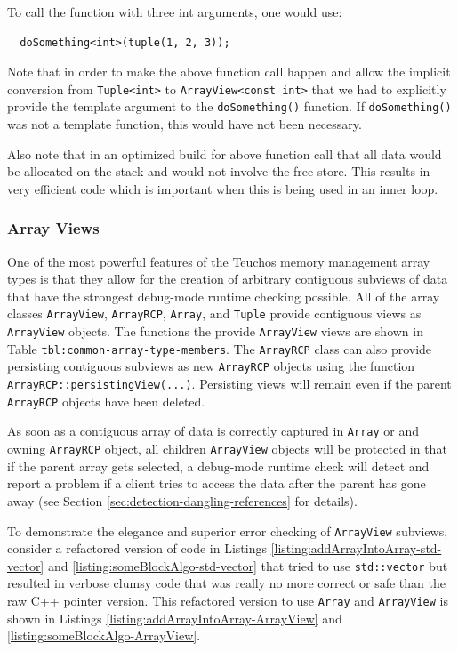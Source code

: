 \documentclass[pdf,ps2pdf,11pt]{SANDreport}
\begin{document}
To call the function with three int arguments, one would use:

{\small\begin{verbatim}
  doSomething<int>(tuple(1, 2, 3));
\end{verbatim}}

Note that in order to make the above function call happen and allow
the implicit conversion from {}\texttt{Tuple<int>} to
{}\texttt{ArrayView<const int>} that we had to explicitly provide the
template argument to the {}\texttt{doSomething()} function.  If
{}\texttt{doSomething()} was not a template function, this would have
not been necessary.

Also note that in an optimized build for above function call that all
data would be allocated on the stack and would not involve the
free-store.  This results in very efficient code which is important
when this is being used in an inner loop.


%
{}\subsubsection{Array Views}
\label{sec:array-views}
%

One of the most powerful features of the Teuchos memory management
array types is that they allow for the creation of arbitrary
contiguous subviews of data that have the strongest debug-mode runtime
checking possible.  All of the array classes {}\texttt{ArrayView},
{}\texttt{ArrayRCP}, {}\texttt{Array}, and {}\texttt{Tuple} provide
contiguous views as {}\texttt{ArrayView} objects.  The functions the
provide {}\texttt{ArrayView} views are shown in Table
{}\texttt{tbl:common-array-type-members}.  The {}\texttt{ArrayRCP}
class can also provide persisting contiguous subviews as new
{}\texttt{ArrayRCP} objects using the function
{}\texttt{ArrayRCP::persistingView(...)}.  Persisting views will
remain even if the parent {}\texttt{ArrayRCP} objects have been deleted.

As soon as a contiguous array of data is correctly captured in
{}\texttt{Array} or and owning {}\texttt{ArrayRCP} object, all
children {}\texttt{ArrayView} objects will be protected in that if the
parent array gets selected, a debug-mode runtime check will detect and
report a problem if a client tries to access the data after the parent
has gone away (see Section {}\ref{sec:detection-dangling-references}
for details).

To demonstrate the elegance and superior error checking of
{}\texttt{ArrayView} subviews, consider a refactored version of code
in Listings {}\ref{listing:addArrayIntoArray-std-vector} and
{}\ref{listing:someBlockAlgo-std-vector} that tried to use
{}\texttt{std::vector} but resulted in verbose clumsy code that was
really no more correct or safe than the raw C++ pointer version.  This
refactored version to use {}\texttt{Array} and {}\texttt{ArrayView} is
shown in Listings {}\ref{listing:addArrayIntoArray-ArrayView} and
{}\ref{listing:someBlockAlgo-ArrayView}.
\end{document}
